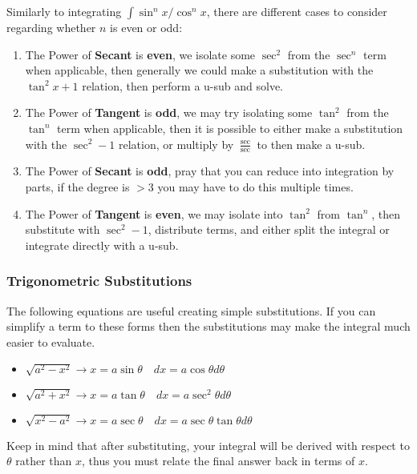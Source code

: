 \documentclass[a4paper]{article}
\begin{document}
  Similarly to integrating $\int \sin^n x/ \cos^n x$, there are different cases to consider regarding whether $n$ is even or odd:
  \begin{enumerate}
    \item The Power of \textbf{Secant} is \textbf{even}, we isolate some $\sec^2$ from the $\sec^n$ term when applicable, then generally we could make a substitution with the $\tan^2 x +1$ relation, then perform a u-sub and solve.
    \item The Power of \textbf{Tangent} is \textbf{odd}, we may try isolating some $\tan^2$ from the $\tan^n$ term when applicable, then it is possible to either make a substitution with the $\sec^2 - 1$ relation, or multiply by $\frac{\sec }{\sec}$ to then make a u-sub.
    \item The Power of \textbf{Secant} is \textbf{odd}, pray that you can reduce into integration by parts, if the degree is $>$3 you may have to do this multiple times.
    \item The Power of \textbf{Tangent} is \textbf{even}, we may isolate into $\tan^2$ from $\tan^n$, then substitute with $\sec^2 - 1$, distribute terms, and either split the integral or integrate directly with a u-sub.
  \end{enumerate}
  \subsubsection{Trigonometric Substitutions}

  The following equations are useful creating simple substitutions. If you can simplify a term to these forms then the substitutions may make the integral much easier to evaluate.

  \begin{itemize}
    \item $\sqrt{a^2-x^2} \rightarrow x =a \sin\theta \quad dx = a\cos\theta d\theta$
    \item $\sqrt{a^2+x^2} \rightarrow x =a \tan\theta \quad dx = a\sec^2\theta d\theta$
    \item $\sqrt{x^2-a^2} \rightarrow x =a \sec\theta \quad dx = a\sec\theta\tan\theta d\theta$

  \end{itemize}
  Keep in mind that after substituting, your integral will be derived with respect to $\theta$ rather than $x$, thus you must relate the final answer back in terms of $x$.
\end{document}
